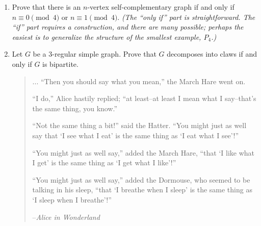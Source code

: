 \documentclass[11pt]{amsart}
\begin{document}
\begin{enumerate}
\item Prove that there is an $n$-vertex self-complementary graph if and only if $n\equiv 0\pmod 4$ or $n\equiv1\pmod4$.  \textit{(The ``only if'' part is straightforward.  The ``if'' part requires a construction, and there are many possible; perhaps the easiest is to generalize the structure of the smallest example, $P_4$.)}

\item Let $G$ be a 3-regular simple graph.  Prove that $G$ decomposes into claws if and only if $G$ is bipartite.


\vfill
\begin{quotation}
\footnotesize
...
``Then you should say what you mean,'' the March Hare went on.

``I do,'' Alice hastily replied; ``at least--at least I mean what I say--that's the same thing, you know.''

``Not the same thing a bit!'' said the Hatter. ``You might just as well say that `I see what I eat' is the same thing as `I eat what I see'!''

``You might just as well say,'' added the March Hare, ``that `I like what I get' is the same thing as `I get what I like'!''

``You might just as well say,'' added the Dormouse, who seemed to be talking in his sleep, ``that `I breathe when I sleep' is the same thing as `I sleep when I breathe'!''

--\emph{Alice in Wonderland}
\end{quotation}
\end{enumerate}
\end{document}
